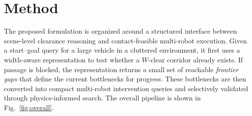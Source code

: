 \section{Method}
\label{sec:method}
The proposed formulation is organized around a structured interface between scene-level clearance reasoning and contact-feasible multi-robot execution. Given a start--goal query for a large vehicle in a cluttered environment, it first uses a width-aware representation to test whether a $W$-clear corridor already exists. If passage is blocked, the representation returns a small set of reachable \emph{frontier gaps} that define the current bottlenecks for progress. These bottlenecks are then converted into compact multi-robot intervention queries and selectively validated through physics-informed search. The overall pipeline is shown in Fig.~\ref{fig:overall}.




